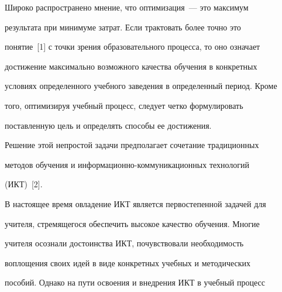 












      \thispagestyle{headings}





      


            \label{st\stat}


            










      Широко распространено мнение, что оптимизация~--- это максимум 


результата при минимуме затрат. Если трактовать более точно это 


понятие~[1] с точки зрения образовательного процесса, то оно означает 


достижение максимально возможного качества обучения в конкретных 


условиях определенного учебного заведения в определенный период. Кроме 


того, оптимизируя учебный процесс, следует четко формулировать 


поставленную цель и определять способы ее достижения. 





Решение этой непростой задачи предполагает сочетание традиционных 


методов обучения и информационно-коммуникационных технологий 


(ИКТ)~[2].





В настоящее время овладение ИКТ является первостепенной задачей для 


учителя, стремящегося обеспечить высокое качество обучения. Многие 


учителя осознали достоинства ИКТ, почувствовали необходимость 


воплощения своих идей в виде конкретных учебных и методических 


пособий. Однако на пути освоения и внедрения ИКТ в учебный процесс 


